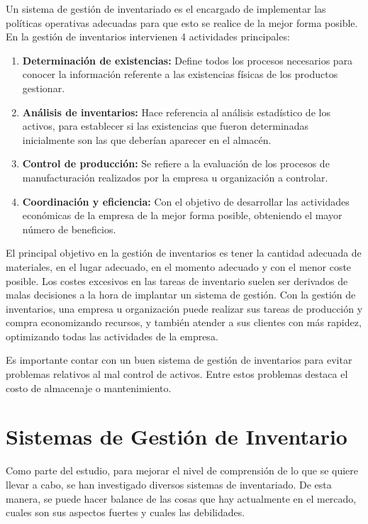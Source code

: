 \documentclass[a4paper,11pt]{book}
\begin{document}
Un sistema de gestión de inventariado es el encargado de implementar las políticas operativas adecuadas para que esto se realice de la mejor forma posible. En la gestión de inventarios intervienen 4 actividades principales:
\begin{enumerate}
\item \textbf{Determinación de existencias:} Define todos los procesos necesarios para conocer la información referente a las existencias físicas de los productos gestionar.
\item \textbf{Análisis de inventarios:} Hace referencia al análisis estadístico de los activos, para establecer si las existencias que fueron determinadas inicialmente son las que deberían aparecer en el almacén.  
\item \textbf{Control de producción:} Se refiere a la evaluación de los procesos de manufacturación realizados por la empresa u organización a controlar.
\item \textbf{Coordinación y eficiencia:} Con el objetivo de desarrollar las actividades económicas de la empresa de la mejor forma posible, obteniendo el mayor número de beneficios. 
\end{enumerate}
 
 

El principal objetivo en la gestión de inventarios es tener la cantidad adecuada de materiales, en el lugar adecuado, en el momento adecuado y con el menor coste posible. Los costes excesivos en las tareas de inventario suelen ser derivados de malas decisiones a la hora de implantar un sistema de gestión. Con la gestión de inventarios, una empresa u organización puede realizar sus tareas de producción y compra economizando recursos, y también atender a sus clientes con más rapidez, optimizando todas las actividades de la empresa.

Es importante contar con un buen sistema de gestión de inventarios para evitar problemas relativos al mal control de activos. Entre estos problemas destaca el costo de almacenaje o mantenimiento. 


\section{Sistemas de Gestión de Inventario}

Como parte del estudio, para mejorar el nivel de comprensión de lo que se quiere llevar a cabo, se han investigado diversos sistemas de inventariado. De esta manera, se puede hacer balance de las cosas que hay actualmente en el mercado, cuales son sus aspectos fuertes y cuales las debilidades. 
\end{document}
